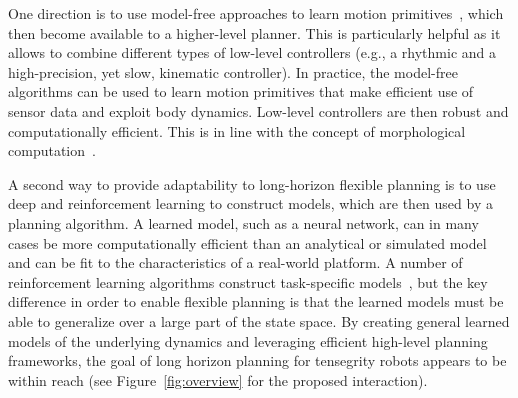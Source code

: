 
One direction is to use model-free approaches to learn motion
primitives~\cite{schaal2003computational}, which then become available
to a higher-level planner.  This is particularly helpful as it allows
to combine different types of low-level controllers (e.g., a rhythmic
and a high-precision, yet slow, kinematic controller).  In practice,
the model-free algorithms can be used to learn motion primitives that
make efficient use of sensor data and exploit body dynamics.  
Low-level controllers are then robust and
computationally efficient.
This is in line with the concept of morphological
computation~\cite{Rieffel2009}. %


A second way to provide adaptability to long-horizon flexible planning
is to use deep and reinforcement learning to construct models, which
are then used by a planning algorithm.  A learned model, such as a
neural network, can in many cases be more computationally efficient
than an analytical or simulated
model~\cite{Kanchanasaratool2002Motion-Control-} and can be fit to the
characteristics of a real-world platform.  A number of reinforcement
learning algorithms construct task-specific
models~\cite{levine2015learning, lenzdeepmpc}, but the key difference
in order to enable flexible planning is that the learned models must
be able to generalize over a large part of the state space.  By
creating general learned models of the underlying dynamics and
leveraging efficient high-level planning frameworks, the goal of long
horizon planning for tensegrity robots appears to be within reach (see
Figure~\ref{fig:overview} for the proposed interaction).
